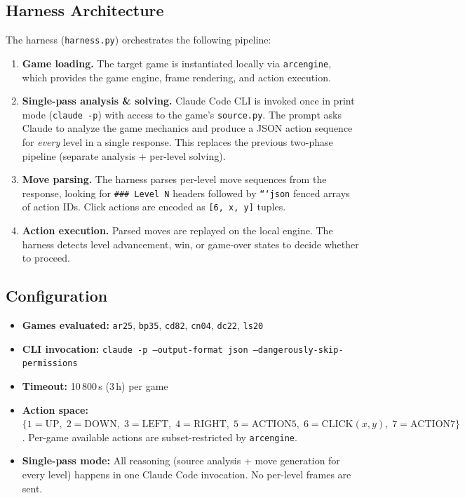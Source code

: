 \documentclass{article}
\begin{document}
\subsection{Harness Architecture}
The harness (\texttt{harness.py}) orchestrates the following pipeline:
\begin{enumerate}
  \item \textbf{Game loading.} The target game is instantiated locally via \texttt{arcengine}, which provides the game engine, frame rendering, and action execution.
  \item \textbf{Single-pass analysis \& solving.} Claude Code CLI is invoked once in print mode (\texttt{claude -p}) with access to the game's \texttt{source.py}. The prompt asks Claude to analyze the game mechanics and produce a JSON action sequence for \emph{every} level in a single response. This replaces the previous two-phase pipeline (separate analysis + per-level solving).
  \item \textbf{Move parsing.} The harness parses per-level move sequences from the response, looking for \texttt{\#\#\# Level N} headers followed by \texttt{```json} fenced arrays of action IDs. Click actions are encoded as \texttt{[6, x, y]} tuples.
  \item \textbf{Action execution.} Parsed moves are replayed on the local engine. The harness detects level advancement, win, or game-over states to decide whether to proceed.
\end{enumerate}

\subsection{Configuration}
\begin{itemize}
  \item \textbf{Games evaluated:} \texttt{ar25}, \texttt{bp35}, \texttt{cd82}, \texttt{cn04}, \texttt{dc22}, \texttt{ls20}
  \item \textbf{CLI invocation:} \texttt{claude -p --output-format json --dangerously-skip-permissions}
  \item \textbf{Timeout:} 10\,800\,s (3\,h) per game
  \item \textbf{Action space:} $\{1\!=\!\text{UP},\; 2\!=\!\text{DOWN},\; 3\!=\!\text{LEFT},\; 4\!=\!\text{RIGHT},\; 5\!=\!\text{ACTION5},\; 6\!=\!\text{CLICK}(x,y),\; 7\!=\!\text{ACTION7}\}$. Per-game available actions are subset-restricted by \texttt{arcengine}.
  \item \textbf{Single-pass mode:} All reasoning (source analysis + move generation for every level) happens in one Claude Code invocation. No per-level frames are sent.
\end{itemize}
\end{document}
